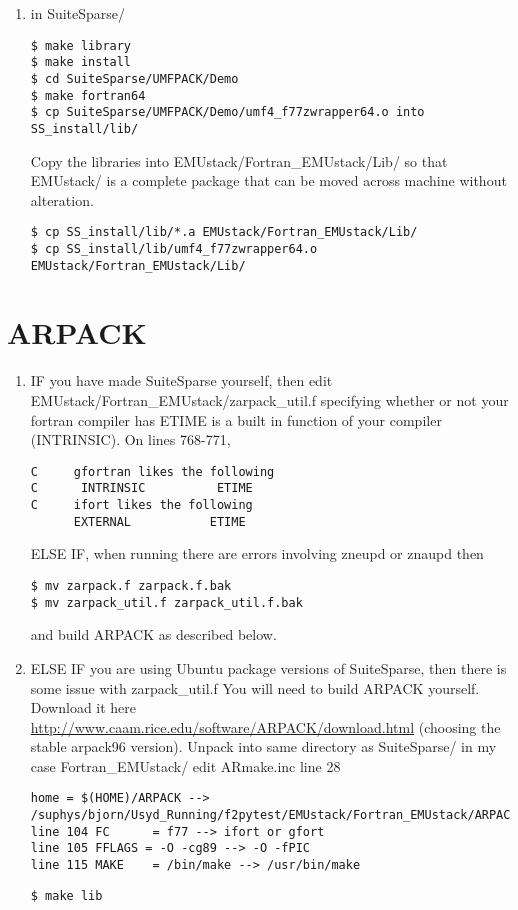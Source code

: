 \documentclass[11pt,a4paper,twoside]{report}
\begin{document}
\begin{enumerate}
\item in SuiteSparse/
\begin{lstlisting}
$ make library
$ make install
$ cd SuiteSparse/UMFPACK/Demo
$ make fortran64
$ cp SuiteSparse/UMFPACK/Demo/umf4_f77zwrapper64.o into SS_install/lib/
\end{lstlisting}
Copy the libraries into EMUstack/Fortran\_EMUstack/Lib/ so that EMUstack/ is a complete package that can be moved across machine without alteration.

\begin{lstlisting}
$ cp SS_install/lib/*.a EMUstack/Fortran_EMUstack/Lib/
$ cp SS_install/lib/umf4_f77zwrapper64.o EMUstack/Fortran_EMUstack/Lib/
\end{lstlisting}
\end{enumerate}





\section{ARPACK}
\label{ARPACK}
\begin{enumerate}
\item IF you have made SuiteSparse yourself, then edit EMUstack/Fortran\_EMUstack/zarpack\_util.f 
specifying whether or not your fortran compiler has ETIME is a built in function of your compiler (INTRINSIC). On lines 768-771,
\begin{lstlisting}
C     gfortran likes the following
C      INTRINSIC          ETIME
C     ifort likes the following
      EXTERNAL           ETIME
\end{lstlisting}

ELSE IF, when running \CodeName there are errors involving zneupd or znaupd then
\begin{lstlisting}
$ mv zarpack.f zarpack.f.bak
$ mv zarpack_util.f zarpack_util.f.bak
\end{lstlisting}
and build ARPACK as described below.
 

\item ELSE IF you are using Ubuntu package versions of SuiteSparse, then there is some issue with zarpack\_util.f
You will need to build ARPACK yourself. Download it here \href{http://www.caam.rice.edu/software/ARPACK/download.html}{http://www.caam.rice.edu/software/ARPACK/download.html} (choosing the stable arpack96 version).
Unpack into same directory as SuiteSparse/ in my case Fortran\_EMUstack/
edit ARmake.inc
line 28 
\begin{lstlisting}
home = $(HOME)/ARPACK --> /suphys/bjorn/Usyd_Running/f2pytest/EMUstack/Fortran_EMUstack/ARPACK
line 104 FC      = f77 --> ifort or gfort
line 105 FFLAGS = -O -cg89 --> -O -fPIC
line 115 MAKE    = /bin/make --> /usr/bin/make
\end{lstlisting}

\begin{lstlisting}
$ make lib
\end{lstlisting}
\end{enumerate}
\end{document}
